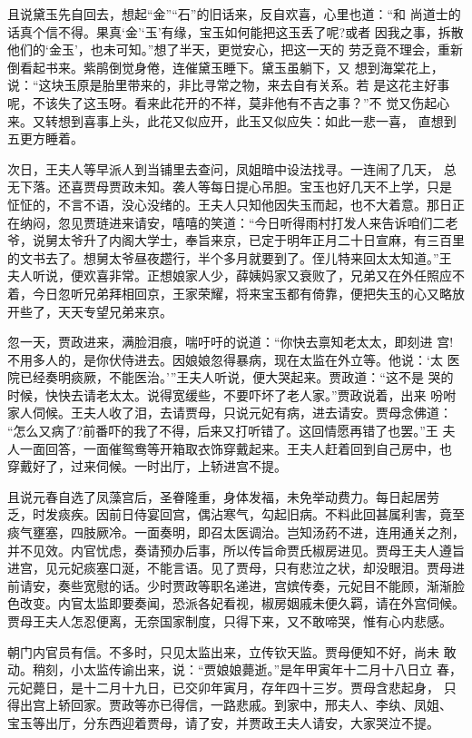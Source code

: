 且说黛玉先自回去，想起“金”“石”的旧话来，反自欢喜，心里也道：“和
尚道士的话真个信不得。果真‘金’‘玉’有缘，宝玉如何能把这玉丢了呢?或者
因我之事，拆散他们的‘金玉’，也未可知。”想了半天，更觉安心，把这一天的
劳乏竟不理会，重新倒看起书来。紫鹃倒觉身倦，连催黛玉睡下。黛玉虽躺下，又
想到海棠花上，说：“这块玉原是胎里带来的，非比寻常之物，来去自有关系。若
是这花主好事呢，不该失了这玉呀。看来此花开的不祥，莫非他有不吉之事？”不
觉又伤起心来。又转想到喜事上头，此花又似应开，此玉又似应失：如此一悲一喜，
直想到五更方睡着。

次日，王夫人等早派人到当铺里去查问，凤姐暗中设法找寻。一连闹了几天，
总无下落。还喜贾母贾政未知。袭人等每日提心吊胆。宝玉也好几天不上学，只是
怔怔的，不言不语，没心没绪的。王夫人只知他因失玉而起，也不大着意。那日正
在纳闷，忽见贾琏进来请安，嘻嘻的笑道：“今日听得雨村打发人来告诉咱们二老
爷，说舅太爷升了内阁大学士，奉旨来京，已定于明年正月二十日宣麻，有三百里
的文书去了。想舅太爷昼夜趱行，半个多月就要到了。侄儿特来回太太知道。”王
夫人听说，便欢喜非常。正想娘家人少，薛姨妈家又衰败了，兄弟又在外任照应不
着，今日忽听兄弟拜相回京，王家荣耀，将来宝玉都有倚靠，便把失玉的心又略放
开些了，天天专望兄弟来京。

忽一天，贾政进来，满脸泪痕，喘吁吁的说道：“你快去禀知老太太，即刻进
宫!不用多人的，是你伏侍进去。因娘娘忽得暴病，现在太监在外立等。他说：‘太
医院已经奏明痰厥，不能医治。’”王夫人听说，便大哭起来。贾政道：“这不是
哭的时候，快快去请老太太。说得宽缓些，不要吓坏了老人家。”贾政说着，出来
吩咐家人伺候。王夫人收了泪，去请贾母，只说元妃有病，进去请安。贾母念佛道：
“怎么又病了?前番吓的我了不得，后来又打听错了。这回情愿再错了也罢。”王
夫人一面回答，一面催鸳鸯等开箱取衣饰穿戴起来。王夫人赶着回到自己房中，也
穿戴好了，过来伺候。一时出厅，上轿进宫不提。

且说元春自选了凤藻宫后，圣眷隆重，身体发福，未免举动费力。每日起居劳
乏，时发痰疾。因前日侍宴回宫，偶沾寒气，勾起旧病。不料此回甚属利害，竟至
痰气壅塞，四肢厥冷。一面奏明，即召太医调治。岂知汤药不进，连用通关之剂，
并不见效。内官忧虑，奏请预办后事，所以传旨命贾氏椒房进见。贾母王夫人遵旨
进宫，见元妃痰塞口涎，不能言语。见了贾母，只有悲泣之状，却没眼泪。贾母进
前请安，奏些宽慰的话。少时贾政等职名递进，宫嫔传奏，元妃目不能顾，渐渐脸
色改变。内官太监即要奏闻，恐派各妃看视，椒房姻戚未便久羁，请在外宫伺候。
贾母王夫人怎忍便离，无奈国家制度，只得下来，又不敢啼哭，惟有心内悲感。

朝门内官员有信。不多时，只见太监出来，立传钦天监。贾母便知不好，尚未
敢动。稍刻，小太监传谕出来，说：“贾娘娘薨逝。”是年甲寅年十二月十八日立
春，元妃薨日，是十二月十九日，已交卯年寅月，存年四十三岁。贾母含悲起身，
只得出宫上轿回家。贾政等亦已得信，一路悲戚。到家中，邢夫人、李纨、凤姐、
宝玉等出厅，分东西迎着贾母，请了安，并贾政王夫人请安，大家哭泣不提。


